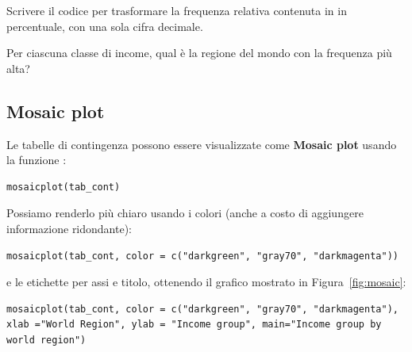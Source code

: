 \vspace{0.5cm} 

\begin{exercise}\label{ex4.2}
	
\noindent Scrivere il codice per trasformare la frequenza relativa contenuta in  in percentuale, con una sola cifra decimale.

\noindent Per ciascuna classe di income, qual \`e la regione del mondo con la frequenza pi\`u alta?

\end{exercise}


\subsection{Mosaic plot}

Le tabelle di contingenza possono essere visualizzate come \textbf{Mosaic plot} usando la funzione :

\begin{lstlisting}[style=Rstylescript]
mosaicplot(tab_cont)
\end{lstlisting}
%
Possiamo renderlo pi\`u chiaro usando i colori (anche a costo di aggiungere informazione ridondante):

\begin{lstlisting}[style=Rstylescript]
mosaicplot(tab_cont, color = c("darkgreen", "gray70", "darkmagenta"))
\end{lstlisting}
%
e le etichette per assi e titolo, ottenendo il grafico mostrato in Figura~\ref{fig:mosaic}:

\begin{lstlisting}[style=Rstylescript]
mosaicplot(tab_cont, color = c("darkgreen", "gray70", "darkmagenta"), xlab ="World Region", ylab = "Income group", main="Income group by world region")
\end{lstlisting}


